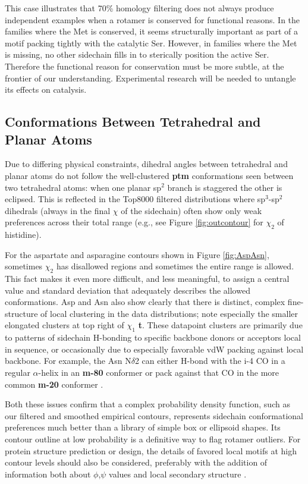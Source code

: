This case illustrates that 70\% homology filtering does not always produce independent examples when a rotamer is conserved for functional reasons. In the families where the Met is conserved, it seems structurally important as part of a motif packing tightly with the catalytic Ser.  However, in families where the Met is missing, no other sidechain fills in to sterically position the active Ser.  Therefore the functional reason for conservation must be more subtle, at the frontier of our understanding.  Experimental research will be needed to untangle its effects on catalysis.

\subsection{Conformations Between Tetrahedral and Planar Atoms}
Due to differing physical constraints, dihedral angles between tetrahedral and planar atoms do not follow the well-clustered \textbf{ptm} conformations seen between two tetrahedral atoms: when one planar sp$^{2}$ branch is staggered the other is eclipsed. This is reflected in the Top8000 filtered distributions where sp$^{3}$-sp$^{2}$ dihedrals  (always in the final $\chi$ of the sidechain) often show only weak preferences across their total range (e.g., see Figure \ref{fig:outcontour} for $\chi_{2}$ of histidine).

For the aspartate and asparagine contours shown in Figure \ref{fig:AspAsn}, sometimes $\chi_{2}$ has disallowed regions and sometimes the entire range is allowed. This fact makes it even more difficult, and less meaningful, to assign a central value and standard deviation that adequately describes the allowed conformations. Asp and Asn also show clearly that there is distinct, complex fine-structure of local clustering in the data distributions; \textcolor{changecolor}{note especially the smaller elongated clusters at top right of $\chi_{1}$ \textbf{t}}. These datapoint clusters are primarily due to patterns of sidechain H-bonding to specific backbone donors or acceptors local in sequence, or occasionally due to especially favorable vdW packing against local backbone.  For example, the Asn N$\delta$2 can either H-bond with the i-4 CO in a regular $\alpha$-helix in an \textbf{m-80} conformer or pack against that CO in the more common \textbf{m-20} conformer \cite{Lovell1999}.

Both these issues confirm that a complex probability density function, such as our filtered and smoothed empirical contours, represents sidechain conformational preferences much better than a library of simple box or ellipsoid shapes. Its contour outline at low probability is a definitive way to flag rotamer outliers.  For protein structure prediction or design, the details of favored local motifs at high contour levels should also be considered, preferably with the addition of information both about $\phi$,$\psi$ values \cite{Bower1997} and local secondary structure \cite{lovell2000penultimate}.
